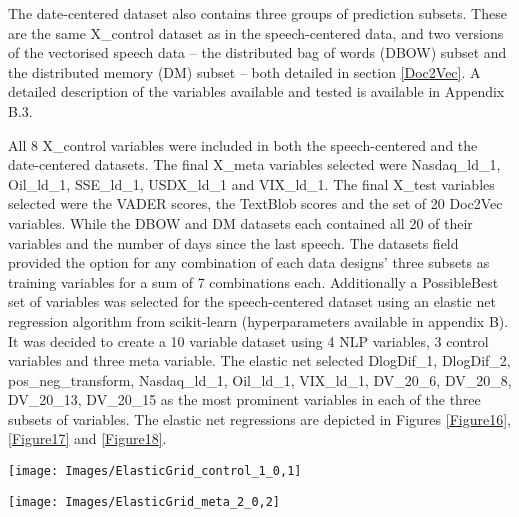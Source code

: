 \documentclass[11pt,preprint, authoryear]{elsarticle}
\let\origfigure\figure
\let\endorigfigure\endfigure
\renewenvironment{figure}[1][2] {
    \expandafter\origfigure\expandafter[H]
} {
    \endorigfigure
}
\numberwithin{equation}{section}
\numberwithin{figure}{section}
\numberwithin{table}{section}
\begin{document}
The date-centered dataset also contains three groups of prediction
subsets. These are the same X\_control dataset as in the speech-centered
data, and two versions of the vectorised speech data -- the distributed
bag of words (DBOW) subset and the distributed memory (DM) subset --
both detailed in section \ref{Doc2Vec}. A detailed description of the
variables available and tested is available in Appendix B.3.

All 8 X\_control variables were included in both the speech-centered and
the date-centered datasets. The final X\_meta variables selected were
Nasdaq\_ld\_1, Oil\_ld\_1, SSE\_ld\_1, USDX\_ld\_1 and VIX\_ld\_1. The
final X\_test variables selected were the VADER scores, the TextBlob
scores and the set of 20 Doc2Vec variables. While the DBOW and DM
datasets each contained all 20 of their variables and the number of days
since the last speech. The datasets field provided the option for any
combination of each data designs' three subsets as training variables
for a sum of 7 combinations each. Additionally a PossibleBest set of
variables was selected for the speech-centered dataset using an elastic
net regression algorithm from scikit-learn (hyperparameters available in
appendix B). It was decided to create a 10 variable dataset using 4 NLP
variables, 3 control variables and three meta variable. The elastic net
selected DlogDif\_1, DlogDif\_2, pos\_neg\_transform, Nasdaq\_ld\_1,
Oil\_ld\_1, VIX\_ld\_1, DV\_20\_6, DV\_20\_8, DV\_20\_13, DV\_20\_15 as
the most prominent variables in each of the three subsets of variables.
The elastic net regressions are depicted in Figures \ref{Figure16},
\ref{Figure17} and \ref{Figure18}.

\begin{figure}[H]

{\centering \texttt{[image: Images/ElasticGrid\_control\_1\_0,1]} 

}

\caption{Elastic net: control set \label{Figure16}}\label{fig:Elastic net: test set}
\end{figure}

\begin{figure}[H]

{\centering \texttt{[image: Images/ElasticGrid\_meta\_2\_0,2]} 

}

\caption{Elastic net: meta set \label{Figure17}}\label{fig:Elastic net: meta set}
\end{figure}
\end{document}
